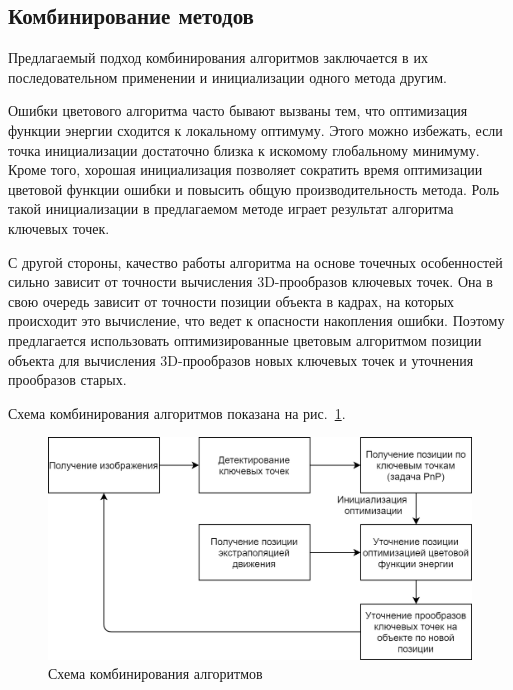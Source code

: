 \subsection{Комбинирование методов}\label{combining}


Предлагаемый подход комбинирования алгоритмов заключается в их последовательном
применении и инициализации одного метода другим.

Ошибки цветового алгоритма часто бывают вызваны тем, что оптимизация функции
энергии сходится к локальному оптимуму.
Этого можно избежать, если точка инициализации достаточно близка к искомому
глобальному минимуму.
Кроме того, хорошая инициализация позволяет сократить время оптимизации
цветовой функции ошибки и повысить общую производительность метода.
Роль такой инициализации в предлагаемом методе играет результат алгоритма
ключевых точек.

С другой стороны, качество работы алгоритма на основе точечных особенностей
сильно зависит от точности вычисления 3D-прообразов ключевых точек.
Она в свою очередь зависит от точности позиции объекта в кадрах, на которых
происходит это вычисление, что ведет к опасности накопления ошибки.
Поэтому предлагается использовать оптимизированные цветовым алгоритмом позиции
объекта для вычисления 3D-прообразов новых ключевых точек и уточнения
прообразов старых.

\newcommand{\XOld}{\ensuremath{\xvec_{\text {\it old}}}}
\newcommand{\XNew}{\ensuremath{\xvec_{\text{\it new}}}}
\newcommand{\ReprErr}[1]{\ensuremath{\vect{e}( #1 )}}

Схема комбинирования алгоритмов показана на рис.~\ref{fig:combining_schema}.

\begin{figure}[t]
\centering
\includegraphics[width=\textwidth]{fig/combining_schema.png}
\caption{
    Схема комбинирования алгоритмов
}\label{fig:combining_schema}
\end{figure}

